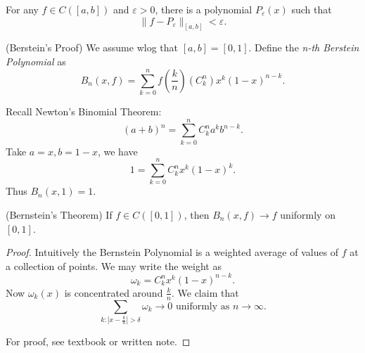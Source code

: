 \begin{theorem}
	For any $f \in C([a,b])$ and $\varepsilon>0$, there is a polynomial $P_\varepsilon(x)$ such that 
\[
		\|f - P_\varepsilon\|_{[a,b]} < \varepsilon
	.\]
\end{theorem}

	(Berstein's Proof)
	We assume wlog that $[a,b] = [0,1]$. Define the \textit{n-th Berstein Polynomial} as
	\[
		B_n(x,f) = \sum_{k=0}^{n} f(\frac{k}{n}) (C^n_k) x^k (1-x)^{n-k}
	.\] 
	\begin{example}
		
	Recall Newton's Binomial Theorem:
	\[
		(a+b)^n = \sum_{k=0}^{n} C^n_k a^k b^{n-k}
	.\] 
	Take $a = x, b = 1-x$, we have
	\[
		1 = \sum_{k=0}^{n} C^n_k x^k (1-x)^k
	.\] 
	Thus $B_n(x, 1) = 1$.

	\end{example}

\begin{theorem}(Bernstein's Theorem)
	If $f \in C([0,1])$, then $B_n(x,f) \to f$ uniformly on $[0,1]$.
	
\end{theorem}
\begin{proof}
	Intuitively the Bernstein Polynomial is a weighted average of values of $f$ at a collection of points. We may write the weight as 
	\[
		\omega_k = C^n_k x^k (1-x)^{n-k}
	.\] 
	Now $\omega_k(x)$ is concentrated around $\frac{k}{n}$. We claim that 
	\[
		\sum_{k: |x - \frac{k}{n}|>\delta} \omega_k \to 0 \text{ uniformly as }n \to  \infty 
	.\] 

	For proof, see textbook or written note.
\end{proof}

